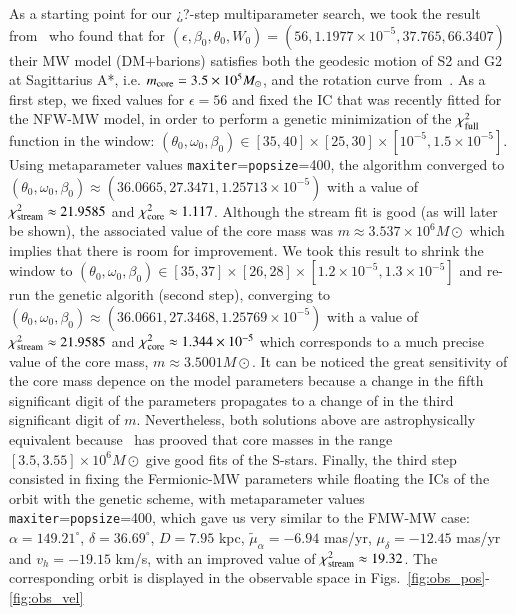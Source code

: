 \documentclass[twocolumn]{aa}
\begin{document}
As a starting point for our ¿?-step multiparameter search, we took the result from~\citet{2020A&A...641A..34B} who found that for $(\epsilon, \beta_0, \theta_0, W_0)=(56, 1.1977\times10^{-5}, 37.765, 66.3407)$
their MW model (DM+barions) satisfies both the geodesic motion of S2 and G2 at Sagittarius A*, i.e. $m_{\rm core}=3.5\times 10^5 M_\odot$, and the rotation curve from~\citet{sofue_rotation_2013}.
As a first step, we fixed values for $\epsilon=56$ and
fixed the IC that was recently fitted for the NFW-MW model, in order to perform a genetic minimization of the
$\chi^2_{\rm{full}}$ function in the window:
$(\theta_0,\omega_0, \beta_0)\in [35, 40]\times[25, 30]\times[10^{-5}, 1.5\times10^{-5}]$. Using metaparameter values \texttt{maxiter}=\texttt{popsize}=400, the algorithm converged to
$(\theta_0, \omega_0, \beta_0)\approx (36.0665,27.3471 , 1.25713\times10^{-5})$
 with a value of $\chi^2_{\rm{stream}}\approx 21.9585$ and  $\chi^2_{\rm{core}}\approx 1.117$.
 Although the stream fit is good (as will later be shown), the associated value of the core mass was
 $m\approx 3.537\times 10^6 M\odot$ which implies that there is room for improvement.
We took this result to shrink the window to $(\theta_0,\omega_0, \beta_0)\in [35, 37]\times[26, 28]\times[1.2\times 10^{-5}, 1.3\times10^{-5}]$ and re-run the genetic algorith (second step), converging
to $(\theta_0, \omega_0, \beta_0)\approx (36.0661, 27.3468,1.25769\times10^{-5})$ with a value of $\chi^2_{\rm{stream}}\approx 21.9585$ and  $\chi^2_{\rm{core}}\approx 1.344\times10^{-5}$ which corresponds to
 a much precise value of the core mass, $m\approx 3.5001 M\odot$. It can be noticed the great sensitivity of the core mass depence on the model parameters because a change in the fifth significant digit of the parameters propagates to a change of in  the third significant digit of $m$. Nevertheless, both solutions above are astrophysically equivalent because~\citet{2021MNRAS.505L..64B} has prooved that core masses in the range $[3.5, 3.55]\times 10^6 M\odot$ give good fits of the S-stars.
Finally, the third step consisted in fixing the Fermionic-MW parameters while floating the ICs of the orbit with the genetic scheme, with metaparameter values \texttt{maxiter}=\texttt{popsize}=400, which gave us very similar to the FMW-MW case:
$\alpha=149.21^{\circ}$, $\delta=36.69^{\circ}$, $D=7.95$ kpc,
$\tilde{\mu}_\alpha=-6.94$ mas/yr, $\mu_\delta=-12.45$ mas/yr and $v_h=-19.15$ km/s, with an improved
value of $\chi^2_{\rm{stream}}\approx 19.32$.
The corresponding orbit is displayed in the observable space in Figs.~\ref{fig:obs_pos}-\ref{fig:obs_vel}~
\end{document}
